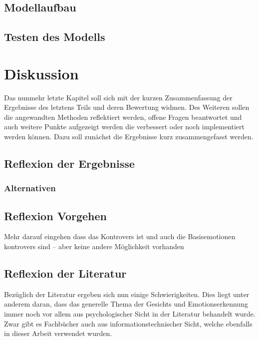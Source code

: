 \documentclass[12pt, a4paper]{scrbook}
\begin{document}
\section{Modellaufbau}


\section{Testen des Modells}

\let\cleardoublepage\relax





\chapter{Diskussion}


Das nunmehr letzte Kapitel soll sich mit der kurzen Zusammenfassung der Ergebnisse des letztens Teils und deren Bewertung widmen. 
Des Weiteren sollen die angewandten Methoden reflektiert werden,
offene Fragen beantwortet und auch weitere Punkte aufgezeigt werden die verbessert oder noch implementiert werden können. Dazu soll zunächst die Ergebnisse kurz zusammengefasst werden.


\section{Reflexion der Ergebnisse}

\subsection{Alternativen}


\section{Reflexion Vorgehen}

Mehr darauf eingehen dass das Kontrovers ist und auch die Basisemotionen kontrovers sind --  aber keine andere Möglichkeit vorhanden 



\section{Reflexion der Literatur}

Bezüglich der Literatur ergeben sich nun einige Schwierigkeiten. Dies liegt unter anderem daran, dass das generelle Thema der Gesichts und Emotionserkennung immer noch vor allem aus
psychologischer Sicht in der Literatur behandelt wurde. Zwar gibt es Fachbücher auch aus informationstechnischer Sicht, welche ebenfalls in dieser Arbeit verwendet wurden.
\end{document}
